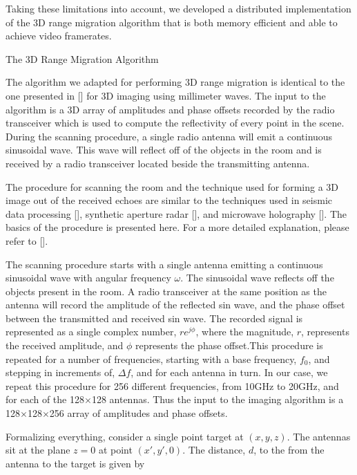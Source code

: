 \documentclass[twocolumn]{article}
\makeatletter
\def\section{\@startsection{section}{1}{\z@}{24pt plus 2 pt
minus 2 pt} {12pt plus 2pt minus 2pt}{\large\bf}}
\makeatother
\begin{document}
Taking these limitations into account, we developed a distributed implementation of the 3D range migration algorithm that is both memory efficient and able to achieve video framerates.

\section{The 3D Range Migration Algorithm}

The algorithm we adapted for performing 3D range migration is identical to the one presented in [] for 3D imaging using millimeter waves. The input to the algorithm is a 3D array of amplitudes and phase offsets recorded by the radio transceiver which is used to compute the reflectivity of every point in the scene. During the scanning procedure, a single radio antenna will emit a continuous sinusoidal wave. This wave will reflect off of the objects in the room and is received by a radio transceiver located beside the transmitting antenna. 

The procedure for scanning the room and the technique used for forming a 3D image out of the received echoes are similar to the techniques used in seismic data processing [], synthetic aperture radar [], and microwave holography []. The basics of the procedure is presented here. For a more detailed explanation, please refer to [].

The scanning procedure starts with a single antenna emitting a continuous sinusoidal wave with angular frequency $\omega$. The sinusoidal wave reflects off the objects present in the room. A radio transceiver at the same position as the antenna will record the amplitude of the reflected sin wave, and the phase offset between the transmitted and received sin wave. The recorded signal is represented as a single complex number, $re^{j\phi}$, where the magnitude, $r$, represents the received amplitude, and $\phi$ represents the phase offset.This procedure is repeated for a number of frequencies, starting with a base frequency, $f_0$, and stepping in increments of, $\Delta f$, and for each antenna in turn. In our case, we repeat this procedure for 256 different frequencies, from 10GHz to 20GHz, and for each of the 128$\times$128 antennas. Thus the input to the imaging algorithm is a 128$\times$128$\times$256 array of amplitudes and phase offsets.

Formalizing everything, consider a single point target at $(x,y,z)$. The antennas sit at the plane $z=0$ at point $(x',y',0)$. The distance, $d$, to the from the antenna to the target is given by
\end{document}
